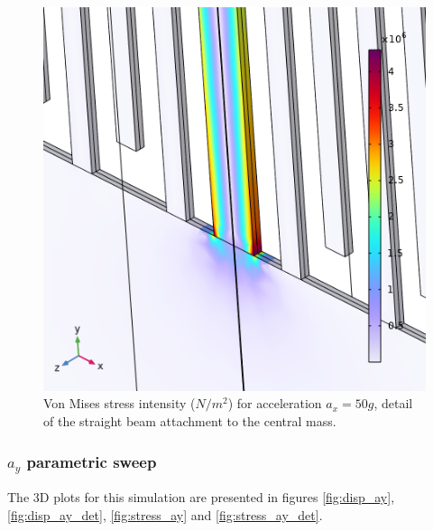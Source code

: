 \documentclass[lettersize,journal]{IEEEtran}
\begin{document}
    \begin{figure}[!h]
        \centering
        \includegraphics[width=1.0\linewidth]{stress_ax_detail}
        \caption{Von Mises stress intensity (\(N/m^2\)) for acceleration \(a_x=50g\), detail of the straight beam attachment to the central mass.}
        \label{fig:stress_ax_det}
    \end{figure}
    
    \begin{figure}
        \centering
        
    \end{figure}
    
    \bigskip
    \subsubsection{\(a_y\) parametric sweep}
    The 3D plots for this simulation are presented in figures \ref{fig:disp_ay}, \ref{fig:disp_ay_det}, \ref{fig:stress_ay} and \ref{fig:stress_ay_det}.
    
\end{document}
